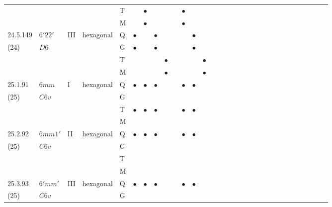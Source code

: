 \documentclass[fleqn,9pt,landscape]{jsarticle}
\begin{document}
\begin{longtable}{lllll|l|l|l|l|l|l|l|l|l|ll|ll|ll|ll|ll|ll|ll|ll}
 &  &  &  & T &  & $\bullet$ &  &  &  & $\bullet$ &  &  &  &  &  &  &  &  &  &  &  &  &  &  &  &  &  &  &  \\
 &  &  &  & M &  & $\bullet$ &  &  &  & $\bullet$ &  &  &  &  &  &  &  &  &  &  &  &  &  &  &  &  &  &  &  \\ \hline
24.5.149 & \texttt{$6'22'$} & III & hexagonal & Q & $\bullet$ &  & $\bullet$ &  &  &  & $\bullet$ &  &  &  &  &  &  &  &  &  &  &  &  &  &  &  &  &  &  \\
(24) & $D6$ &  &  & G & $\bullet$ &  & $\bullet$ &  &  &  & $\bullet$ &  &  &  &  &  &  &  &  &  &  &  &  &  &  &  &  &  &  \\
 &  &  &  & T &  &  &  & $\bullet$ &  &  &  & $\bullet$ &  &  &  &  &  &  &  &  &  &  &  &  &  &  &  &  &  \\
 &  &  &  & M &  &  &  & $\bullet$ &  &  &  & $\bullet$ &  &  &  &  &  &  &  &  &  &  &  &  &  &  &  &  &  \\ \hline
25.1.91 & \texttt{$6mm$} & I & hexagonal & Q & $\bullet$ & $\bullet$ & $\bullet$ &  &  & $\bullet$ & $\bullet$ &  &  &  &  &  &  &  &  &  &  &  &  &  &  &  &  &  &  \\
(25) & $C6v$ &  &  & G &  &  &  &  &  &  &  &  &  &  &  &  &  &  &  &  &  &  &  &  &  &  &  &  &  \\
 &  &  &  & T & $\bullet$ & $\bullet$ & $\bullet$ &  &  & $\bullet$ & $\bullet$ &  &  &  &  &  &  &  &  &  &  &  &  &  &  &  &  &  &  \\
 &  &  &  & M &  &  &  &  &  &  &  &  &  &  &  &  &  &  &  &  &  &  &  &  &  &  &  &  &  \\ \hline
25.2.92 & \texttt{$6mm1'$} & II & hexagonal & Q & $\bullet$ & $\bullet$ & $\bullet$ &  &  & $\bullet$ & $\bullet$ &  &  &  &  &  &  &  &  &  &  &  &  &  &  &  &  &  &  \\
(25) & $C6v$ &  &  & G &  &  &  &  &  &  &  &  &  &  &  &  &  &  &  &  &  &  &  &  &  &  &  &  &  \\
 &  &  &  & T &  &  &  &  &  &  &  &  &  &  &  &  &  &  &  &  &  &  &  &  &  &  &  &  &  \\
 &  &  &  & M &  &  &  &  &  &  &  &  &  &  &  &  &  &  &  &  &  &  &  &  &  &  &  &  &  \\ \hline
25.3.93 & \texttt{$6'mm'$} & III & hexagonal & Q & $\bullet$ & $\bullet$ & $\bullet$ &  &  & $\bullet$ & $\bullet$ &  &  &  &  &  &  &  &  &  &  &  &  &  &  &  &  &  &  \\
(25) & $C6v$ &  &  & G &  &  &  &  &  &  &  &  &  &  &  &  &  &  &  &  &  &  &  &  &  &  &  &  &  \\

\end{longtable}
\end{document}
